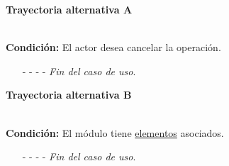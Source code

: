 \hypertarget{CU5-3:TAA}{\textbf{Trayectoria alternativa A}}\\
\noindent \textbf{Condición:} El actor desea cancelar la operación.
\begin{enumerate}
	\UCpaso[\UCactor] Solicita cancelar la operación oprimiendo el botón  del mensaje emergente.
	\UCpaso[\UCsist] Muestra la pantalla .
	\item[- -] - - {\em {Fin del caso de uso}}.%
\end{enumerate}

\hypertarget{CU5-3:TAB}{\textbf{Trayectoria alternativa B}}\\
\noindent \textbf{Condición:} El módulo tiene \hyperlink{tElemento}{elementos} asociados.
\begin{enumerate}
	\UCpaso[\UCsist] Muestra el mensaje  en la pantalla .
	\item[- -] - - {\em {Fin del caso de uso}}.%
\end{enumerate}
	

